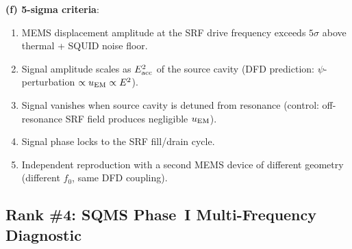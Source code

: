 \documentclass[11pt]{article}
\theoremstyle{definition}
\theoremstyle{remark}
\begin{document}
\begin{tcolorbox}[colback=green!5!white, colframe=green!60!black,
  title=\textbf{RANK \#3: CHANNEL~B (P11+P2 JOINT) --- NOW HIGHEST-PRIORITY
  BOUND-IMPROVING EXPERIMENT}]
\textbf{(f) 5-sigma criteria}:
\begin{enumerate}[nosep]
\item MEMS displacement amplitude at the SRF drive frequency exceeds
  $5\sigma$ above thermal + SQUID noise floor.
\item Signal amplitude scales as $E_{\rm acc}^2$ of the source cavity
  (DFD prediction: $\psi$-perturbation $\propto u_{\rm EM} \propto E^2$).
\item Signal vanishes when source cavity is detuned from resonance
  (control: off-resonance SRF field produces negligible $u_{\rm EM}$).
\item Signal phase locks to the SRF fill/drain cycle.
\item Independent reproduction with a second MEMS device of different
  geometry (different $f_0$, same DFD coupling).
\end{enumerate}

\end{tcolorbox}


\subsection{Rank \#4: SQMS Phase~I Multi-Frequency Diagnostic}
\label{ssec:rank4}
\end{document}
